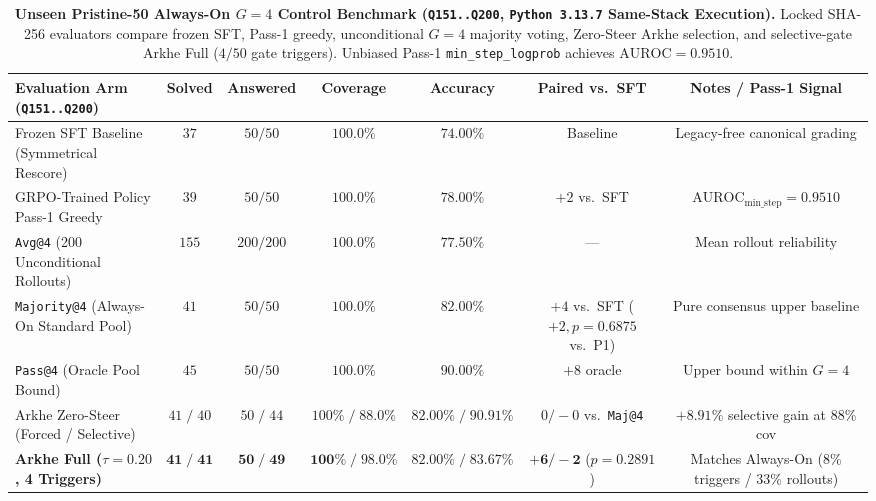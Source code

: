 \documentclass[11pt,a4paper]{article}
\begin{document}
\begin{table}[t]
\centering
\caption{\textbf{Unseen Pristine-50 Always-On $G=4$ Control Benchmark (\texttt{Q151..Q200}, \texttt{Python 3.13.7} Same-Stack Execution).} Locked SHA-256 evaluators compare frozen SFT, Pass-1 greedy, unconditional $G=4$ majority voting, Zero-Steer Arkhe selection, and selective-gate Arkhe Full ($4/50$ gate triggers). Unbiased Pass-1 \texttt{min\_step\_logprob} achieves $\text{AUROC}=0.9510$.}
\label{tab:pristine50_always_on}
\small
\begin{tabular}{@{}lcccccc@{}}
\toprule
\textbf{Evaluation Arm (\texttt{Q151..Q200})} & \textbf{Solved} & \textbf{Answered} & \textbf{Coverage} & \textbf{Accuracy} & \textbf{Paired vs.\ SFT} & \textbf{Notes / Pass-1 Signal} \\
\midrule
Frozen SFT Baseline (Symmetrical Rescore) & $37$ & $50/50$ & $100.0\%$ & $74.00\%$ & Baseline & Legacy-free canonical grading \\
GRPO-Trained Policy Pass-1 Greedy & $39$ & $50/50$ & $100.0\%$ & $78.00\%$ & $+2$ vs.\ SFT & $\text{AUROC}_{\text{min\_step}} = \mathbf{0.9510}$ \\
\texttt{Avg@4} (200 Unconditional Rollouts) & $155$ & $200/200$ & $100.0\%$ & $77.50\%$ & --- & Mean rollout reliability \\
\texttt{Majority@4} (Always-On Standard Pool) & $41$ & $50/50$ & $100.0\%$ & $82.00\%$ & $+4$ vs.\ SFT ($+2, p=0.6875$ vs.\ P1) & Pure consensus upper baseline \\
\texttt{Pass@4} (Oracle Pool Bound) & $45$ & $50/50$ & $100.0\%$ & $90.00\%$ & $+8$ oracle & Upper bound within $G=4$ \\
\midrule
Arkhe Zero-Steer (Forced / Selective) & $41 \;/\; 40$ & $50 \;/\; 44$ & $100\% \;/\; 88.0\%$ & $82.00\% \;/\; \mathbf{90.91\%}$ & $0/-0$ vs.\ \texttt{Maj@4} & $+8.91\%$ selective gain at 88\% cov \\
\textbf{Arkhe Full ($\tau=0.20$, 4 Triggers)} & $\mathbf{41 \;/\; 41}$ & $\mathbf{50 \;/\; 49}$ & $\mathbf{100\% \;/\; 98.0\%}$ & $\mathbf{82.00\% \;/\; 83.67\%}$ & $\mathbf{+6/-2}$ ($p=0.2891$) & Matches Always-On (8\% triggers / 33\% rollouts) \\
\bottomrule
\end{tabular}
\end{table}
\end{document}
